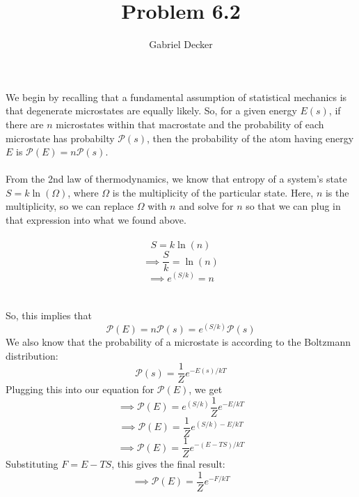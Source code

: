 \documentclass[12pt]{article}
\title{Problem 6.2}
\author{Gabriel Decker}
\begin{document}
\maketitle
\begin{flushleft}

We begin by recalling that a fundamental assumption of statistical mechanics is that degenerate microstates are equally likely.
So, for a given energy $E(s)$, if there are $n$ microstates within that macrostate and the probability of each microstate has probabilty $\mathcal{P}(s)$, then the probability of the atom having energy $E$ is $\mathcal{P}(E)=n\mathcal{P}(s)$.\\~\\

From the 2nd law of thermodynamics, we know that entropy of a system's state $S=k\ln(\Omega)$, where $\Omega$ is the multiplicity of the particular state.
Here, $n$ is the multiplicity, so we can replace $\Omega$ with $n$ and solve for $n$ so that we can plug in that expression into what we found above.\\~\\

$$S=k\ln(n)$$
$$\implies \frac{S}{k}=\ln(n)$$
$$\implies e^{(S/k)}=n$$\\~\\

So, this implies that
$$\mathcal{P}(E)=n\mathcal{P}(s)=e^{(S/k)}\mathcal{P}(s)$$
We also know that the probability of a microstate is according to the Boltzmann distribution:
$$\mathcal{P}(s)=\frac{1}{Z}e^{-E(s)/kT}$$
Plugging this into our equation for $\mathcal{P}(E)$, we get
$$\implies\mathcal{P}(E)=e^{(S/k)}\frac{1}{Z}e^{-E/kT}$$
$$\implies\mathcal{P}(E)=\frac{1}{Z}e^{(S/k)-E/kT}$$
$$\implies\mathcal{P}(E)=\frac{1}{Z}e^{-(E-TS)/kT}$$
Substituting $F=E-TS$, this gives the final result:
$$\implies\mathcal{P}(E)=\frac{1}{Z}e^{-F/kT}$$




\end{flushleft}
\end{document}
